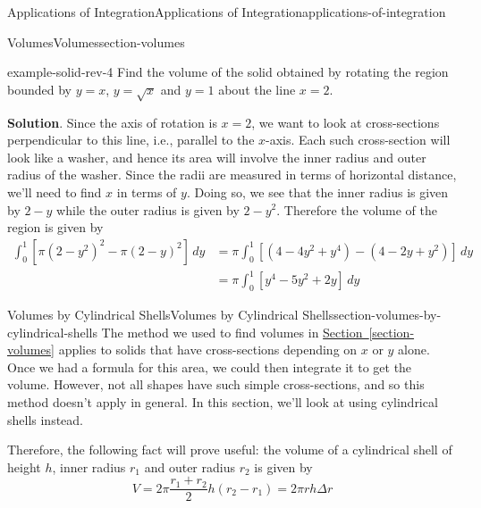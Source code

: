 \documentclass[oneside,10pt,]{book}
\numberwithin{equation}{section}
\newcommand{\amp}{&}
\begin{document}
\begin{chapterptx}{Applications of Integration}{}{Applications of Integration}{}{}{applications-of-integration}
\begin{sectionptx}{Volumes}{}{Volumes}{}{}{section-volumes}
\begin{example}{}{example-solid-rev-4}%
\hypertarget{p-636}{}%
Find the volume of the solid obtained by rotating the region bounded by \(y = x\), \(y = \sqrt{x}\) and \(y = 1\) about the line \(x = 2\).%
\par\smallskip%
\noindent\textbf{Solution}.\hypertarget{solution-139}{}\quad%
\hypertarget{p-637}{}%
Since the axis of rotation is \(x = 2\), we want to look at cross-sections perpendicular to this line, i.e., parallel to the \(x\)-axis. Each such cross-section will look like a washer, and hence its area will involve the inner radius and outer radius of the washer. Since the radii are measured in terms of horizontal distance, we'll need to find \(x\) in terms of \(y\). Doing so, we see that the inner radius is given by \(2 - y\) while the outer radius is given by \(2 - y^{2}\). Therefore the volume of the region is given by%
\begin{align*}
\int_{0}^{1}\left[\pi(2 - y^{2})^{2} - \pi(2 - y)^{2}\right]\,dy \amp= \pi\int_{0}^{1}\left[(4 - 4y^{2} + y^{4}) - (4 - 2y + y^{2})\right]\,dy\\
\amp= \pi\int_{0}^{1}\left[y^{4} - 5y^{2} + 2y\right]\,dy
\end{align*}
%
\end{example}
\end{sectionptx}
%
%
\typeout{************************************************}
\typeout{************************************************}
%
\begin{sectionptx}{Volumes by Cylindrical Shells}{}{Volumes by Cylindrical Shells}{}{}{section-volumes-by-cylindrical-shells}
\hypertarget{p-638}{}%
The method we used to find volumes in \hyperref[section-volumes]{Section~\ref{section-volumes}} applies to solids that have cross-sections depending on \(x\) or \(y\) alone. Once we had a formula for this area, we could then integrate it to get the volume. However, not all shapes have such simple cross-sections, and so this method doesn't apply in general. In this section, we'll look at using cylindrical shells instead.%
\par
\hypertarget{p-639}{}%
Therefore, the following fact will prove useful: the volume of a cylindrical shell of height \(h\), inner radius \(r_{1}\) and outer radius \(r_{2}\) is given by%
\begin{equation}
V = 2\pi\frac{r_{1} + r_{2}}{2}h(r_{2} - r_{1}) = 2\pi rh\Delta r\label{equation-volume-cylindrical-shell}
\end{equation}

\end{sectionptx}
\end{chapterptx}
\end{document}
